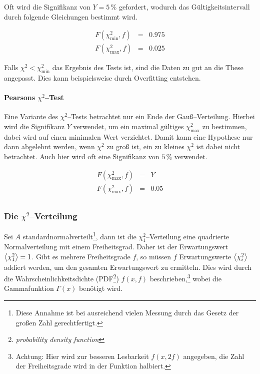 \documentclass[12pt,a4paper]{scrartcl}
\numberwithin{equation}{section} %
\renewcommand{\[}{} %
\renewcommand{\]}{\noindent} %
\begin{document}
Oft wird die Signifikanz von \(Y=5\,\%\) gefordert, wodurch das
Gültigkeitsintervall durch folgende Gleichungen bestimmt wird.

\[
\begin{eqnarray}
    F(\chi^2_\mathrm{min}, f) &=& 0.975 \label{eq:ChiMinFormula} \\
    F(\chi^2_\mathrm{max}, f) &=& 0.025 \label{eq:ChiMaxFormula}
\end{eqnarray}
\]

Falls \(\chi^2<\chi^2_\mathrm{min}\) das Ergebnis des Tests ist, sind
die Daten zu gut an die These angepasst. Dies kann beispielsweise durch
Overfitting entstehen.

\hypertarget{pearsons-chi2test}{%
\paragraph{\texorpdfstring{Pearsons
\(\chi^2\)--Test}{Pearsons \textbackslash chi\^{}2--Test}}\label{pearsons-chi2test}}

Eine Variante des \(\chi^2\)--Tests betrachtet nur ein Ende der
Gauß--Verteilung. Hierbei wird die Signifikanz \(Y\) verwendet, um ein
maximal gültiges \(\chi_\mathrm{max}^2\) zu bestimmen, dabei wird auf
einen minimalen Wert verzichtet. \cite{McHugh} Damit kann eine Hypothese
nur dann abgelehnt werden, wenn \(\chi^2\) zu groß ist, ein zu kleines
\(\chi^2\) ist dabei nicht betrachtet. Auch hier wird oft eine
Signifikanz von \(5\,\%\) verwendet.

\[
\begin{eqnarray}
    F(\chi^2_\mathrm{max}, f) &=& Y \\
    F(\chi^2_\mathrm{max}, f) &=& 0.05 \label{eq:ChiMaxPearson} \\
\end{eqnarray}
\]

\hypertarget{die-chi2verteilung}{%
\subsubsection{\texorpdfstring{Die
\(\chi^2\)--Verteilung}{Die \textbackslash chi\^{}2--Verteilung}}\label{die-chi2verteilung}}

Sei \(A\) standardnormalverteilt\footnote{Diese Annahme ist bei
  ausreichend vielen Messung durch das Gesetz der großen Zahl
  gerechtfertigt.}, dann ist die \(\chi_1^2\)--Verteilung eine
quadrierte Normalverteilung mit einem Freiheitsgrad. Daher ist der
Erwartungswert \(\expval{\chi_1^2}=1\). Gibt es mehrere Freiheitsgrade
\(f\), so müssen \(f\) Erwartungswerte \(\expval{\chi_i^2}\) addiert
werden, um den gesamten Erwartungswert zu ermitteln. Dies wird durch die
Wahrscheinlichkeitsdichte (PDF\footnote{\emph{probability density
  function}}) \(f(x, f)\) beschrieben,\footnote{Achtung: Hier wird zur
  besseren Lesbarkeit \(f(x, 2f)\) angegeben, die Zahl der
  Freiheitsgrade wird in der Funktion halbiert.} wobei die Gammafunktion
\(\Gamma(x)\) benötigt wird.
\end{document}
